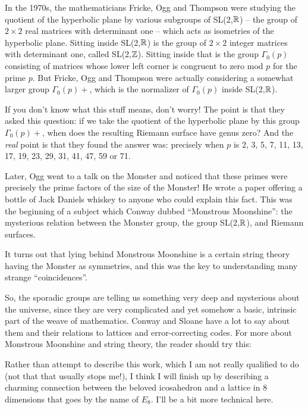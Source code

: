 In the 1970s, the mathematicians Fricke, Ogg and Thompson were studying the quotient of the hyperbolic plane by various subgroups of SL(2,$\mathbb R$) -- the group of $2 \times 2$ real matrices with determinant one -- which acts as isometries of the hyperbolic plane. Sitting inside SL(2,$\mathbb R$) is the group of $2 \times 2$ integer matrices with determinant one, called SL(2,$\mathbb Z$). Sitting inside that is the group $\Gamma_0(p)$ consisting of matrices whose lower left corner is congruent to zero mod $p$ for the prime $p$. But Fricke, Ogg and Thompson were actually considering a somewhat larger group $\Gamma_0(p)+$, which is the normalizer of $\Gamma_0(p)$ inside SL(2,$\mathbb R$).

If you don't know what this stuff means, don't worry! The point is that they asked this question: if we take the quotient of the hyperbolic plane by this group $\Gamma_0(p)+$, when does the resulting Riemann surface have genus zero? And the \emph{real} point is that they found the answer was: precisely when $p$ is 2, 3, 5, 7, 11, 13, 17, 19, 23, 29, 31, 41, 47, 59 or 71.

Later, Ogg went to a talk on the Monster and noticed that these primes were precisely the prime factors of the size of the Monster! He wrote a paper offering a bottle of Jack Daniels whiskey to anyone who could explain this fact. This was the beginning of a subject which Conway dubbed ``Monstrous Moonshine'': the mysterious relation between the Monster group, the group SL(2,$\mathbb R$), and Riemann surfaces.

It turns out that lying behind Monstrous Moonshine is a certain string theory having the Monster as symmetries, and this was the key to understanding many strange ``coincidences''.

So, the sporadic groups are telling us something very deep and mysterious about the universe, since they are very complicated and yet somehow a basic, intrinsic part of the weave of mathematics. Conway and Sloane have a lot to say about them and their relations to lattices and error-correcting codes. For more about Monstrous Moonshine and string theory, the reader should try this:


Rather than attempt to describe this work, which I am not really qualified to do (not that that usually stops me!), I think I will finish up by describing a charming connection between the beloved icosahedron and a lattice in 8 dimensions that goes by the name of $E_8$. I'll be a bit more technical here.

